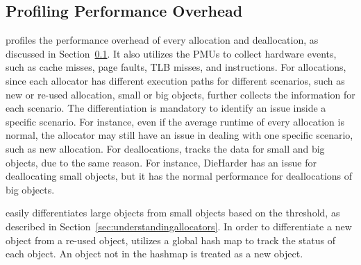 \subsection{Profiling Performance Overhead}

\label{sec:performanceimplement}

\MP{} profiles the performance overhead of every allocation and deallocation, as discussed in Section~\ref{sec:performanceimplement}. It also utilizes the PMUs to collect hardware events, such as cache misses, page faults, TLB misses, and instructions. For allocations, since each allocator has different execution paths for different scenarios, such as new or re-used allocation, small or big objects, \MP{} further collects the information for each scenario. The differentiation is mandatory to identify an issue inside a specific scenario. For instance, even if the average runtime of every allocation is normal, the allocator may still have an issue in dealing with one specific scenario, such as new allocation.  For deallocations, \MP{} tracks the data for small and big objects, due to the same reason. For instance, DieHarder has an issue for deallocating small objects, but it has the normal performance for deallocations of big objects.  

\MP{} easily differentiates large objects from small objects based on the threshold,  as described in Section~\ref{sec:understandingallocators}. In order to differentiate a new object from a re-used object, \MP{} utilizes a global hash map to track the status of each object. An object not in the hashmap is treated as a new object. 



